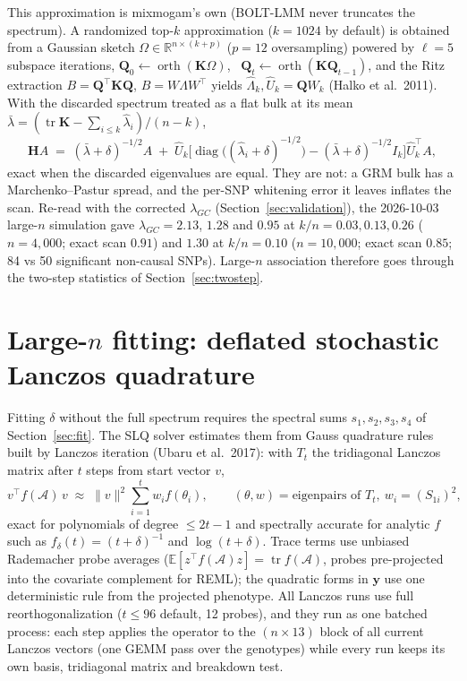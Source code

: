 \documentclass[11pt]{article}
\newcommand{\y}{\mathbf{y}}
\newcommand{\K}{\mathbf{K}}
\newcommand{\Am}{\mathcal{A}}
\newcommand{\Q}{\mathbf{Q}}
\newcommand{\Hm}{\mathbf{H}}
\newcommand{\R}{\mathbb{R}}
\newcommand{\tr}{\operatorname{tr}}
\newcommand{\E}{\mathbb{E}}
\begin{document}
This approximation is mixmogam's own (BOLT-LMM never truncates the
spectrum). A randomized top-$k$ approximation ($k = 1024$ by default)
is obtained from a Gaussian sketch $\Omega \in \R^{n\times(k+p)}$
($p = 12$ oversampling) powered by $\ell = 5$ subspace iterations,
$\Q_0 \gets \operatorname{orth}(\K\Omega)$, \
$\Q_t \gets \operatorname{orth}(\K\Q_{t-1})$, and the Ritz extraction
$B = \Q^\top\K\Q$, $B = W\Lambda W^\top$ yields
$\hat\Lambda_k, \hat U_k = \Q W_k$ (Halko et al.\ 2011). With the
discarded spectrum treated as a flat bulk at its mean
$\bar\lambda = (\tr\K - \sum_{i\le k}\hat\lambda_i)/(n-k)$,
\begin{equation}
  \Hm A \;=\; (\bar\lambda+\delta)^{-1/2} A \;+\;
  \hat U_k\Big[\operatorname{diag}\big((\hat\lambda_i + \delta)^{-1/2}\big) -
  (\bar\lambda+\delta)^{-1/2} I_k\Big]\hat U_k^\top A ,
  \label{eq:tail}
\end{equation}
exact when the discarded eigenvalues are equal. They are not: a GRM
bulk has a Marchenko--Pastur spread, and the per-SNP whitening error it
leaves inflates the scan. Re-read with the corrected $\lambda_{GC}$
(Section~\ref{sec:validation}), the 2026-10-03 large-$n$ simulation gave
$\lambda_{GC} = 2.13$, $1.28$ and $0.95$ at $k/n = 0.03, 0.13, 0.26$
($n = 4{,}000$; exact scan $0.91$) and $1.30$ at $k/n = 0.10$
($n = 10{,}000$; exact scan $0.85$; 84 vs 50 significant non-causal
SNPs). Large-$n$ association therefore goes
through the two-step statistics of Section~\ref{sec:twostep}.

\section{Large-\texorpdfstring{$n$}{n} fitting: deflated stochastic Lanczos quadrature}
\label{sec:slq}

Fitting $\delta$ without the full spectrum requires the spectral sums
$s_1, s_2, s_3, s_4$ of Section~\ref{sec:fit}. The SLQ solver
estimates them from Gauss quadrature rules built by Lanczos iteration
(Ubaru et al.\ 2017): with $T_t$ the tridiagonal Lanczos matrix after
$t$ steps from start vector $v$,
\begin{equation}
  v^\top f(\Am)\,v \;\approx\; \|v\|^2 \sum_{i=1}^{t} w_i f(\theta_i),
  \qquad (\theta, w) = \text{eigenpairs of } T_t,\ w_i = (S_{1i})^2,
\end{equation}
exact for polynomials of degree $\le 2t{-}1$ and spectrally accurate
for analytic $f$ such as $f_\delta(t) = (t + \delta)^{-1}$ and
$\log(t+\delta)$. Trace terms use unbiased Rademacher probe averages
($\E[z^\top f(\Am) z] = \tr f(\Am)$, probes pre-projected into the
covariate complement for REML); the quadratic forms in $\y$ use one
deterministic rule from the projected phenotype. All Lanczos runs use
full reorthogonalization ($t \le 96$ default, 12 probes), and they run as
one batched process: each step applies the operator to the $(n \times
13)$ block of all current Lanczos vectors (one GEMM pass over the
genotypes) while every run keeps its own basis, tridiagonal matrix and
breakdown test.
\end{document}
